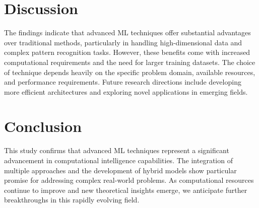 \documentclass[12pt,a4paper]{article}
\begin{document}
\section{Discussion}
The findings indicate that advanced ML techniques offer substantial advantages over traditional methods, particularly in handling high-dimensional data and complex pattern recognition tasks. However, these benefits come with increased computational requirements and the need for larger training datasets. The choice of technique depends heavily on the specific problem domain, available resources, and performance requirements. Future research directions include developing more efficient architectures and exploring novel applications in emerging fields.

\section{Conclusion}
This study confirms that advanced ML techniques represent a significant advancement in computational intelligence capabilities. The integration of multiple approaches and the development of hybrid models show particular promise for addressing complex real-world problems. As computational resources continue to improve and new theoretical insights emerge, we anticipate further breakthroughs in this rapidly evolving field.

\begin{thebibliography}{99}

\end{thebibliography}
\end{document}
